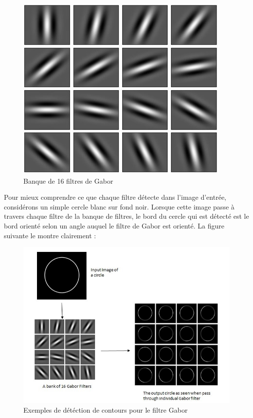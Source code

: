 \documentclass[12pt, openany]{report}
\begin{document}
\begin{figure}[H]
\centering
\includegraphics[scale=0.9]{gabor_16_filtres.jpg}
\caption{Banque de 16 filtres de Gabor}
\end{figure}

Pour mieux comprendre ce que chaque filtre détecte dans l'image d'entrée, considérons un simple cercle blanc sur fond noir. Lorsque cette image passe à travers chaque filtre de la banque de filtres, le bord du cercle qui est détecté est le bord orienté selon un angle auquel le filtre de Gabor est orienté. La figure suivante le montre clairement :

\begin{figure}[H]
\centering
\includegraphics[scale=0.9]{gabor_method.jpg}
\caption{Exemples de détéction de contours pour le filtre Gabor}
\end{figure}
\end{document}

